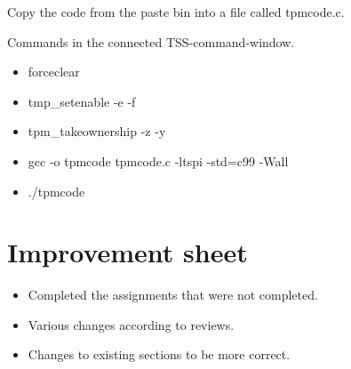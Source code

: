 \documentclass[10pt]{article}
\begin{document}
Copy the code from the paste bin into a file called tpmcode.c.

Commands in the connected TSS-command-window.
\begin{itemize}
  \item{forceclear}
  \item{tmp\_setenable -e -f}
  \item{tpm\_takeownership -z -y}
  \item{gcc -o tpmcode tpmcode.c -ltspi -std=c99 -Wall}
  \item{./tpmcode}
\end{itemize}

\section{Improvement sheet}
\begin{itemize}
    \item {Completed the assignments that were not completed.}
    \item {Various changes according to reviews.}
    \item {Changes to existing sections to be more correct.}
\end{itemize}
\end{document}
